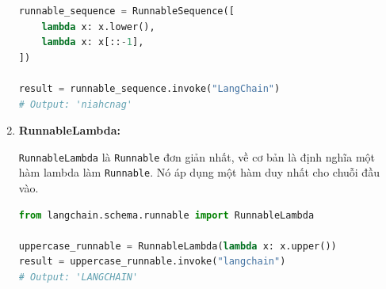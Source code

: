 \documentclass[11pt]{article}
\begin{document}
\begin{enumerate}
\begin{boxC}
\begin{lstlisting}[language=Python, caption=Ví dụ về RunnableSequence]
runnable_sequence = RunnableSequence([
    lambda x: x.lower(),
    lambda x: x[::-1],
])

result = runnable_sequence.invoke("LangChain")
# Output: 'niahcnag'
        \end{lstlisting}
    \end{boxC}

    \item \textbf{RunnableLambda:}
    \begin{boxC}
        \texttt{RunnableLambda} là \texttt{Runnable} đơn giản nhất, về cơ bản là định nghĩa một hàm lambda làm \texttt{Runnable}. Nó áp dụng một hàm duy nhất cho chuỗi đầu vào.
        \begin{lstlisting}[language=Python, caption=Ví dụ về RunnableLambda]
from langchain.schema.runnable import RunnableLambda

uppercase_runnable = RunnableLambda(lambda x: x.upper())
result = uppercase_runnable.invoke("langchain")
# Output: 'LANGCHAIN'
        \end{lstlisting}
    \end{boxC}
\end{enumerate}
\end{document}
